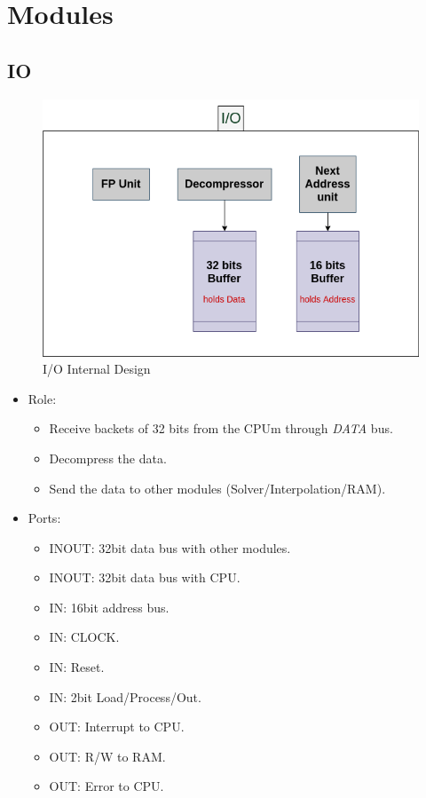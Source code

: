 \documentclass[12pt]{report}
\begin{document}
\section{Modules}

\subsection{IO}

\begin{figure}[hp]
    \centering
    \includegraphics[width=\textwidth]{IO}
    \caption{I/O Internal Design}
    \label{fig:io}
\end{figure}

\begin{itemize}
    \item Role:
    \begin{itemize}
        \item Receive backets of 32 bits from the CPUm through \emph{DATA} bus.
        \item Decompress the data.
        \item Send the data to other modules (Solver/Interpolation/RAM).
    \end{itemize}
    \item Ports:
    \begin{itemize}
        \item INOUT: 32bit data bus with other modules.
        \item INOUT: 32bit data bus with CPU.
        \item IN: 16bit address bus.
        \item IN: CLOCK.
        \item IN: Reset.
        \item IN: 2bit Load/Process/Out.
        \item OUT: Interrupt to CPU.
        \item OUT: R/W to RAM.
        \item OUT: Error to CPU.
    \end{itemize}
\end{itemize}
\end{document}
